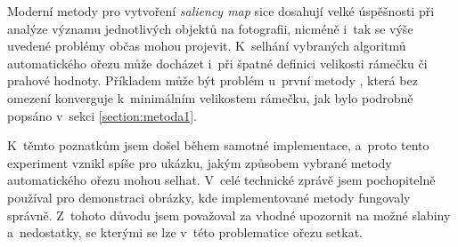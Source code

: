 Moderní metody pro vytvoření \emph{saliency map} sice dosahují velké úspěšnosti při analýze významu jednotlivých objektů na fotografii, nicméně i~tak se výše uvedené problémy občas mohou projevit. K~selhání vybraných algoritmů automatického ořezu může docházet i~při špatné definici velikosti rámečku či prahové hodnoty. Příkladem může být problém u~první metody \cite{Stentiford2007}, která bez omezení konverguje k~minimálním velikostem rámečku, jak bylo podrobně popsáno v~sekci \ref{section:metoda1}.

K~těmto poznatkům jsem došel během samotné implementace, a~proto tento experiment vznikl spíše pro ukázku, jakým způsobem vybrané metody automatického ořezu mohou selhat. V~celé technické zprávě jsem pochopitelně používal pro demonstraci obrázky, kde implementované metody fungovaly správně. Z~tohoto důvodu jsem považoval za vhodné upozornit na možné slabiny a~nedostatky, se kterými se lze v~této problematice ořezu setkat.

